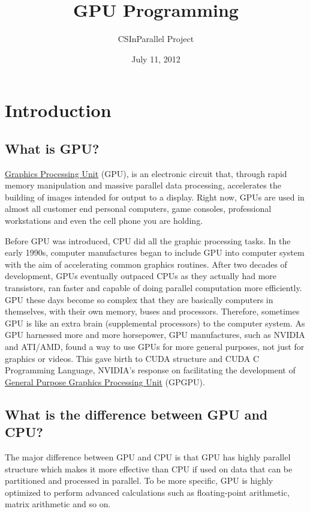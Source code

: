 \documentclass[letterpaper,10pt,openany,oneside]{sphinxmanual}
\title{GPU Programming}
\date{July 11, 2012}
\author{CSInParallel Project}
\begin{document}
\maketitle
\tableofcontents
{}\label{index::doc}



\chapter{Introduction}
\label{Introduction/Introduction:introduction}\label{Introduction/Introduction:gpu-programming}\label{Introduction/Introduction::doc}

\section{What is GPU?}
\label{Introduction/Introduction:what-is-gpu}
\href{http://en.wikipedia.org/wiki/GPU}{Graphics Processing Unit} (GPU), is an electronic circuit that, through rapid memory manipulation and massive parallel data processing, accelerates the building of images intended for output to a display. Right now, GPUs are used in almost all customer end personal computers, game consoles, professional workstations and even the cell phone you are holding.

Before GPU was introduced, CPU did all the graphic processing tasks. In the early 1990s, computer manufactures began to include GPU into computer system with the aim of accelerating common graphics routines. After two decades of development, GPUs eventually outpaced CPUs as they actually had more transistors, ran faster and capable of doing parallel computation more efficiently. GPU these days become so complex that they are basically computers in themselves, with their own memory, buses and processors. Therefore, sometimes GPU is like an extra brain (supplemental processors) to the computer system. As GPU harnessed more and more horsepower, GPU manufactures, such as NVIDIA and ATI/AMD, found a way to use GPUs  for more general purposes, not just for graphics or videos. This gave birth to CUDA structure and CUDA C Programming Language, NVIDIA's response on facilitating the development of \href{http://en.wikipedia.org/wiki/GPGPU}{General Purpose Graphics Processing Unit} (GPGPU).


\section{What is the difference between GPU and CPU?}
\label{Introduction/Introduction:general-purpose-graphics-processing-unit}\label{Introduction/Introduction:what-is-the-difference-between-gpu-and-cpu}
The major difference between GPU and CPU is that GPU has highly parallel structure which makes it more effective than CPU if used on data that can be partitioned and processed in parallel. To be more specific, GPU is highly optimized to perform advanced calculations such as floating-point arithmetic, matrix arithmetic and so on.
\end{document}
